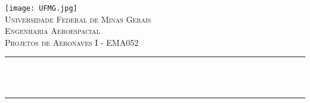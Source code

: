 \begin{titlepage}
	\centering
    \vfill
    \texttt{[image: UFMG.jpg]}\\[1.5 cm]	
    \textsc{\LARGE Universidade Federal de Minas Gerais}\\[1.0 cm]
	\textsc{\Large Engenharia Aeroespacial}\\[0.5 cm]
	\textsc{\large Projetos de Aeronaves I - EMA052}\\[0.5 cm]
    \vfill
	\rule{\linewidth}{0.2 mm} \\[0.4 cm]
	{ \huge \bfseries \thetitle}\\
	\rule{\linewidth}{0.2 mm} \\
	
    \vfill

	\theauthor
    
    \vfill
    
	{\large \thedate}\\
	
\end{titlepage}
